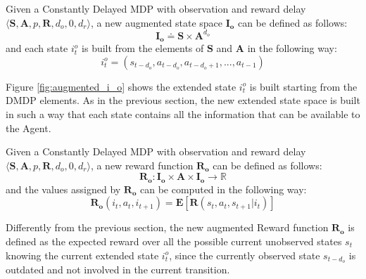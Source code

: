                 \begin{definition}
                    \label{def:obsaugmentstate}
                    Given a Constantly Delayed MDP with observation and reward delay $\langle \mathbf{S}, \mathbf{A}, p, \mathbf{R}, d_o, 0, d_r \rangle$,
                    a new augmented state space $\mathbf{I_{o}}$ can be defined as follows:
                    \[ \mathbf{I_{o}} \doteq \mathbf{S} \times \mathbf{A}^{d_o} \]
                    and each state $i^o_t$ is built from the elements of $\mathbf{S}$ and $\mathbf{A}$ in the following way:
                    \[ i_t^o= \left( s_{t-d_{o}}, a_{t-d_{o}}, a_{t-d_{o}+1}, ..., a_{t-1} \right)\]
                \end{definition}
                
                Figure \ref{fig:augmented_i_o} shows the extended state $i_t^o$ is built starting from the DMDP elements. As in the previous section, the new extended state space is built in such a way that each state contains all the information that can be available to the Agent.
                
                \begin{definition}
                    \label{def:obsaugmentreward}
                    Given a Constantly Delayed MDP with observation and reward delay $ \langle \mathbf{S}, \mathbf{A}, p, \mathbf{R}, d_o, 0, d_r \rangle$,
                    a new reward function $\mathbf{R_{o}}$ can be defined as follows:
                    \[ \mathbf{R_{o}}: \mathbf{I_{o}} \times \mathbf{A} \times \mathbf{I_{o}} \rightarrow \mathds{R}\]
                    and the values assigned by $\mathbf{R_{o}}$ can be computed in the following way:
                    \[ \mathbf{R_{o}}\left( i_t, a_{t}, i_{t+1} \right) = \mathbf{E} \left[ \mathbf{R} \left( s_t, a_t, s_{t+1} | i_t \right) \right] \]
                \end{definition}
                
                Differently from the previous section, the new augmented Reward function $\mathbf{R_o}$ is defined as the expected reward over all the possible current unobserved states $s_t$ knowing the current extended state $i^o_t$, since the currently observed state $s_{t-d_{o}}$ is outdated and not involved in the current transition. 
                
